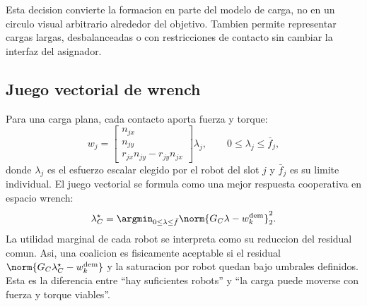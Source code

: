 Esta decision convierte la formacion en parte del modelo de carga, no en un circulo
visual arbitrario alrededor del objetivo. Tambien permite representar cargas largas,
desbalanceadas o con restricciones de contacto sin cambiar la interfaz del asignador.

\subsection{Juego vectorial de wrench}

Para una carga plana, cada contacto aporta fuerza y torque:
\[
  w_j =
  \begin{bmatrix}
  n_{jx}\\ n_{jy}\\ r_{jx}n_{jy}-r_{jy}n_{jx}
  \end{bmatrix}\lambda_j,
  \qquad 0 \le \lambda_j \le \bar f_j,
\]
donde $\lambda_j$ es el esfuerzo escalar elegido por el robot del slot $j$ y $\bar f_j$
es su limite individual. El juego vectorial se formula como una mejor respuesta
cooperativa en espacio wrench:
\[
  \lambda_C^\star =
  \argmin_{0 \le \lambda \le \bar f}
  \norm{G_C\lambda - w_k^{\rm dem}}_2^2.
\]
La utilidad marginal de cada robot se interpreta como su reduccion del residual comun.
Asi, una coalicion es fisicamente aceptable si el residual
$\norm{G_C\lambda_C^\star-w_k^{\rm dem}}$ y la saturacion por robot quedan bajo umbrales
definidos. Esta es la diferencia entre ``hay suficientes robots'' y ``la carga puede
moverse con fuerza y torque viables''.
